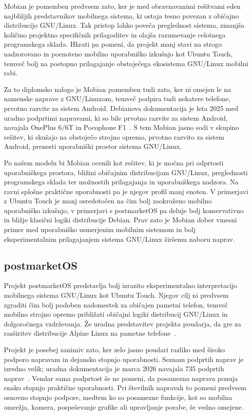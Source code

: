 \documentclass[a4paper,12pt,openright]{book}
\begin{document}
Mobian je pomemben predvsem zato, ker je med obravnavanimi rešitvami eden najbližjih predstavnikov mobilnega sistema, ki ostaja tesno povezan z običajno distribucijo GNU/Linux.
Tak pristop lahko poveča preglednost sistema, zmanjša količino projektno specifičnih prilagoditev in olajša razumevanje celotnega programskega sklada.
Hkrati pa pomeni, da projekt manj stavi na strogo nadzorovano in poenoteno mobilno uporabniško izkušnjo kot Ubuntu Touch, temveč bolj na postopno prilagajanje obstoječega ekosistema GNU/Linux mobilni rabi.

Za to diplomsko nalogo je Mobian pomemben tudi zato, ker ni omejen le na namenske naprave z GNU/Linuxom, temveč podpira tudi nekatere telefone, prvotno razvite za sistem Android.
Debianova dokumentacija je leta 2025 med uradno podprtimi napravami, ki so bile prvotno razvite za sistem Android, navajala OnePlus 6/6T in Pocophone F1~\cite{mobian_devices}.
S tem Mobian jasno sodi v skupino rešitev, ki skušajo na obstoječo strojno opremo, prvotno razvito za sistem Android, prenesti uporabniški prostor sistema GNU/Linux.

Po našem modelu bi Mobian ocenili kot rešitev, ki je močna pri odprtosti uporabniškega prostora, bližini običajnim distribucijam GNU/Linux, preglednosti programskega sklada ter možnostih prilagajanja in uporabniškega nadzora.
Na ravni splošne praktične uporabnosti pa je njegov profil manj enoten.
V primerjavi z Ubuntu Touch je manj osredotočen na čim bolj zaokroženo mobilno uporabniško izkušnjo, v primerjavi s postmarketOS pa deluje bolj konservativno in bližje klasični logiki distribucije Debian.
Prav zato je Mobian dober vmesni primer med uporabniško usmerjenim mobilnim sistemom in bolj eksperimentalnim prilagajanjem sistema GNU/Linux širšemu naboru naprav.

\subsection{postmarketOS}

Projekt postmarketOS predstavlja bolj izrazito eksperimentalno interpretacijo mobilnega sistema GNU/Linux kot Ubuntu Touch.
Njegov cilj ni predvsem zgraditi čim bolj podoben nadomestek za običajen pametni telefon, temveč mobilno strojno opremo približati običajni logiki distribucij GNU/Linux in dolgoročnega vzdrževanja.
Že uradna predstavitev projekta poudarja, da gre za razširitev distribucije Alpine Linux na pametne telefone~\cite{postmarketos_about}.

Projekt je posebej zanimiv zato, ker zelo jasno poudari razliko med široko podporo napravam in dejansko stopnjo uporabnosti.
Seznam podprtih naprav je izredno velik; uradna dokumentacija je marca 2026 navajala 735 podprtih naprav~\cite{postmarketos_devices}.
Vendar sama podprtost še ne pomeni, da posamezna naprava ponuja enako stopnjo praktične uporabnosti.
Pri številnih napravah to pomeni predvsem osnovno stopnjo podpore, medtem ko so posamezne funkcije, kot so mobilna omrežja, kamera, pospeševanje grafike ali upravljanje porabe, še vedno omejene.
\end{document}
